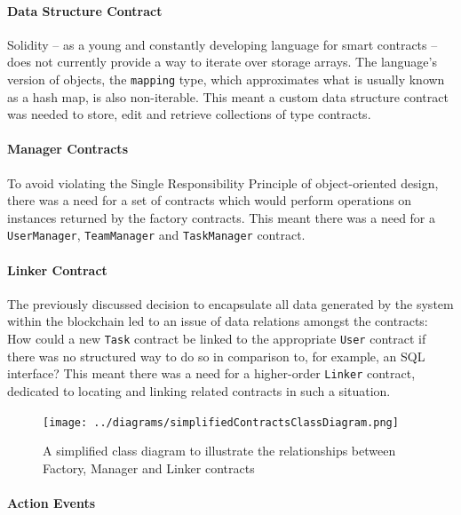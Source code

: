 \documentclass[12pt]{report}
\let\oldparagraph\paragraph
\renewcommand{\paragraph}[1]{\oldparagraph{#1}\mbox{}}
\begin{document}
\paragraph{Data Structure Contract}\label{data-structure-contract}

Solidity -- as a young and constantly developing language for smart
contracts -- does not currently provide a way to iterate over storage
arrays. The language's version of objects, the \texttt{mapping} type,
which approximates what is usually known as a hash map, is also
non-iterable. This meant a custom data structure contract was needed to
store, edit and retrieve collections of type contracts.

\paragraph{Manager Contracts}\label{manager-contracts}

To avoid violating the Single Responsibility
Principle\cite{martin2003agile} of object-oriented design, there was a
need for a set of contracts which would perform operations on instances
returned by the factory contracts. This meant there was a need for a
\texttt{UserManager}, \texttt{TeamManager} and \texttt{TaskManager}
contract.

\paragraph{Linker Contract}\label{linker-contract}

The previously discussed decision to encapsulate all data generated by
the system within the blockchain led to an issue of data relations
amongst the contracts: How could a new \texttt{Task} contract be linked
to the appropriate \texttt{User} contract if there was no structured way
to do so in comparison to, for example, an SQL interface? This meant
there was a need for a higher-order \texttt{Linker} contract, dedicated
to locating and linking related contracts in such a situation.

\begin{figure}[htbp]
\centering
\texttt{[image: ../diagrams/simplifiedContractsClassDiagram.png]}
\caption{A simplified class diagram to illustrate the relationships
between Factory, Manager and Linker contracts}
\end{figure}

\paragraph{Action Events}\label{action-events}
\end{document}
